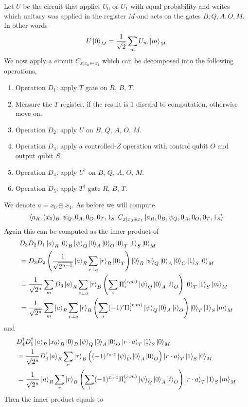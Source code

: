 \documentclass{article}
\begin{document}
Let $U$ be the circuit that applies $U_{0}$ or $U_{1}$ with equal probability and writes which unitary was applied in the register $M$ and acts on the gates $B,Q,A,O,M$. In other words \begin{align}
    U\ket{0}_{M}=\frac{1}{\sqrt{2}}\sum_{m}U_{m}\ket{m}_{M}
\end{align}We now apply a circuit $C_{x|x_{0}\oplus x_{1}}$ which can be decomposed into the following operations, \begin{enumerate}
    \item Operation $D_{1}$: apply $T$ gate on $R$, $B$, $T$.
    \item Measure the $T$ register, if the result is $1$ discard to computation, otherwise move on.
    \item Operation $D_{2}$: apply $U$ on $B$, $Q$, $A$, $O$, $M$.
    \item Operation $D_{3}$: apply a controlled-$Z$ operation with control qubit $O$ and output qubit $S$.
    \item Operation $D_{4}$: apply $U^{\dagger}$ on $B$, $Q$, $A$, $O$, $M$.
    \item Operation $D_{5}$: apply $T^{\dagger}$ gate $R$, $B$, $T$.
\end{enumerate} We denote $a=x_{0}\oplus x_{1}$. As before we will compute \begin{align}
\bra{a_{R},(x_{0})_{B},\psi_{Q},0_{A},0_{O},0_{T},1_{S}}C_{x|x_{0}\oplus x_{1}}\ket{a_{R},0_{B},\psi_{Q},0_{A},0_{O},0_{T},1_{S}}
\end{align} Again this can be computed as the inner product of
\begin{align}
    &D_{3}D_{2}D_{1}\ket{a}_{R}\ket{0}_{B}\ket{\psi}_{Q}\ket{0}_{A}\ket{0}_{O}\ket{0}_{T}\ket{1}_{S}\ket{0}_{M}\\
    &=D_{3}D_{2}\left(\frac{1}{\sqrt{2^{n-1}}}\ket{a}_{R}\sum_{r\perp a}\ket{r}_{B}\ket{0}_{T}\right)\ket{0}_{B}\ket{\psi}_{Q}\ket{0}_{A}\ket{0}_{O}\ket{1}_{S}\ket{0}_{M}\\
    &=\frac{1}{\sqrt{2^{n}}}\sum_{m}D_{3}\ket{a}_{R}\sum_{r\perp a}\ket{r}_{B}\left(\sum_{i}\Pi_{i}^{(r,m)}\ket{\psi}_{Q}\ket{0}_{A}\ket{i}_{O}\right)\ket{0}_{T}\ket{1}_{S}\ket{m}_{M}\\
    &=\frac{1}{\sqrt{2^{n}}}\sum_{m}\ket{a}_{R}\sum_{r\perp a}\ket{r}_{B}\left(\sum_{i}(-1)^{i}\Pi_{i}^{(r,m)}\ket{\psi}_{Q}\ket{0}_{A}\ket{i}_{O}\right)\ket{0}_{T}\ket{1}_{S}\ket{m}_{M}
\end{align} and \begin{align}
    &D_{4}^{\dagger}D_{5}^{\dagger}\ket{a}_{R}\ket{x_{0}}_{B}\ket{0}_{B}\ket{\psi}_{Q}\ket{0}_{A}\ket{0}_{O}\ket{r\cdot a}_{T}\ket{1}_{S}\ket{0}_{M}\\
    &=\frac{1}{\sqrt{2^{n}}}D_{4}^{\dagger}\ket{a}_{R}\sum_{r}\ket{r}_{B}\left((-1)^{x_{0}\cdot z}\ket{\psi}_{Q}\ket{0}_{A}\ket{0}_{O}\right)\ket{r\cdot a}_{T}\ket{1}_{S}\ket{0}_{M}\\    &=\frac{1}{\sqrt{2^{n}}}\ket{a}_{R}\sum_{r}\ket{r}_{B}\left(\sum_{i}(-1)^{x_{0}\cdot z}\Pi_{i}^{(r,m)}\ket{\psi}_{Q}\ket{0}_{A}\ket{i}_{O}\right)\ket{r\cdot a}_{T}\ket{1}_{S}\ket{m}_{M}
\end{align} Then the inner product equals to
\end{document}
